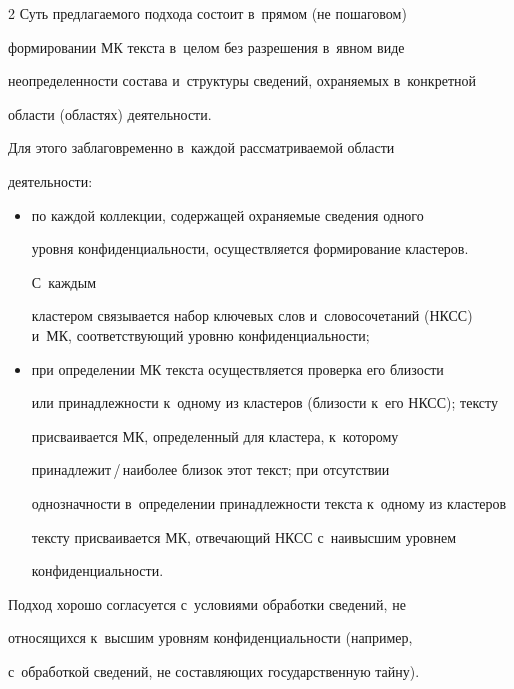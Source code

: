 \begin{multicols}{2}
  Суть предлагаемого подхода состоит в~прямом (не пошаговом) 


формировании МК текста в~целом без разрешения в~явном виде 


неопределенности состава и~структуры сведений, охраняемых в~конкретной 


области (областях) деятельности.


  


  Для этого заблаговременно в~каждой рассматриваемой области 


деятельности:


  \begin{itemize}


  \item  по каждой коллекции, содержащей охра\-ня\-емые сведения одного 


уровня кон\-фи\-ден\-ци\-аль\-ности, осуществляется формирование клас\-те\-ров. 


С~каж\-дым  


клас\-те\-ром связывается \mbox{набор} ключевых слов и~словосочетаний (НКСС) и~МК, соответствующий уровню конфиденциальности;


  \item при определении МК текста осуществляется проверка его бли\-зости 


или принадлежности к~одному из клас\-те\-ров (близости к~его НКСС); текс\-ту 


присваивается МК, определенный для кластера, к~которому  


при\-над\-ле\-жит\,/\,на\-и\-бо\-лее близок этот текст; при отсутствии 


однозначности в~определении принадлежности текс\-та к~одному из клас\-те\-ров 


текс\-ту присваивается МК, отвечающий НКСС с~наивысшим уровнем 


конфиденциальности.


  \end{itemize}


   


  Подход хорошо согласуется с~условиями обработки сведений, не 


относящихся к~высшим уровням конфиденциальности (например, 


с~обработкой сведений, не составляющих государственную тайну).


  



\end{multicols}
